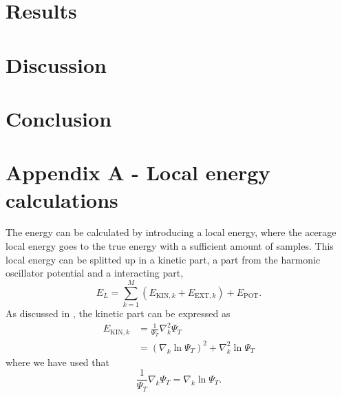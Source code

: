 \documentclass[norsk,a4paper,12pt]{article}
\begin{document}
\section{Results} \label{sec:Results}

\section{Discussion} \label{sec:Discussion}

\section{Conclusion} \label{sec:Conclusion}

\newpage

\section{Appendix A - Local energy calculations} \label{sec:appendix_A}
The energy can be calculated by introducing a local energy, where the acerage local energy goes to the true energy with a sufficient amount of samples. This local energy can be splitted up in a kinetic part, a part from the harmonic oscillator potential and a interacting part,
\begin{equation}
E_L=\sum_{k=1}^{M}(E_{\text{KIN},k} + E_{\text{EXT},k})+E_{\text{POT}}.
\end{equation}
As discussed in \cite{Nordhagen}, the kinetic part can be expressed as
\begin{align}
E_{\text{KIN},k}&=\frac{1}{\Psi_T}\nabla_k^2\Psi_T\\
&=(\nabla_k\ln\Psi_T)^2+\nabla_k^2\ln\Psi_T
\end{align}
where we have used that
\begin{equation}
\frac{1}{\Psi_T}\nabla_k\Psi_T=\nabla_k\ln\Psi_T.
\end{equation}
\end{document}
